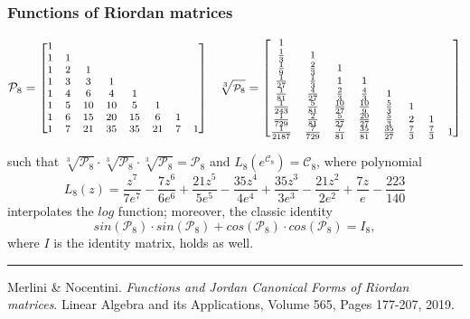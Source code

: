 \documentclass[9pt]{beamer}
\begin{document}
\begin{frame}[fragile]
\frametitle{Functions of Riordan matrices}
\begin{displaymath}
\footnotesize
    \mathcal{P}_{8}=\left[\begin{matrix}1 &   &   &   &   &   &   &  \\1 & 1 &   &   &   &   &   &  \\1 & 2 & 1 &   &   &   &   &  \\1 & 3 & 3 & 1 &   &   &   &  \\1 & 4 & 6 & 4 & 1 &   &   &  \\1 & 5 & 10 & 10 & 5 & 1 &   &  \\1 & 6 & 15 & 20 & 15 & 6 & 1 &  \\1 & 7 & 21 & 35 & 35 & 21 & 7 & 1\end{matrix}\right]
    \quad
    \sqrt[3]{\mathcal{P}_{8}}= \left[\begin{matrix}1 &  &  &  &  &  &  & \\\frac{1}{3} & 1 &  &  &  &  &  & \\\frac{1}{9} & \frac{2}{3} & 1 &  &  &  &  & \\\frac{1}{27} & \frac{1}{3} & 1 & 1 &  &  &  & \\\frac{1}{81} & \frac{4}{27} & \frac{2}{3} & \frac{4}{3} & 1 &  &  & \\\frac{1}{243} & \frac{5}{81} & \frac{10}{27} & \frac{10}{9} & \frac{5}{3} & 1 &  & \\\frac{1}{729} & \frac{2}{81} & \frac{5}{27} & \frac{20}{27} & \frac{5}{3} & 2 & 1 & \\\frac{1}{2187} & \frac{7}{729} & \frac{7}{81} & \frac{35}{81} & \frac{35}{27} & \frac{7}{3} & \frac{7}{3} & 1\end{matrix}\right]
\end{displaymath}

such that %
$\sqrt[3]{\mathcal{P}_8} \cdot \sqrt[3]{\mathcal{P}_8} \cdot
\sqrt[3]{\mathcal{P}_8} =\mathcal{P}_8$ and
$L_{8}\left({e^{\mathcal{C}_{8}}}\right) = \mathcal{C}_{8}$, where polynomial
\begin{displaymath}
{L_{ 8 }}{\left (z \right )} = \frac{z^{7}}{7 e^{7}} - \frac{7 z^{6}}{6 e^{6}} + \frac{21 z^{5}}{5 e^{5}} - \frac{35 z^{4}}{4 e^{4}} + \frac{35 z^{3}}{3 e^{3}} - \frac{21 z^{2}}{2 e^{2}} + \frac{7 z}{e} - \frac{223}{140}
\end{displaymath}
interpolates the $log$ function; moreover, the classic identity
$$sin(\mathcal{P}_8)\cdot sin(\mathcal{P}_8)+
cos(\mathcal{P}_8)\cdot cos(\mathcal{P}_8)=I_{8},$$
where $I$ is the identity matrix, holds as well.
\vfill
\noindent\rule{\textwidth}{0.1pt}
{\footnotesize
Merlini \& Nocentini. \textit{Functions and Jordan Canonical Forms of Riordan
matrices}. \newline Linear Algebra and its Applications, Volume 565, Pages 177-207, 2019.}
\end{frame}
\end{document}
